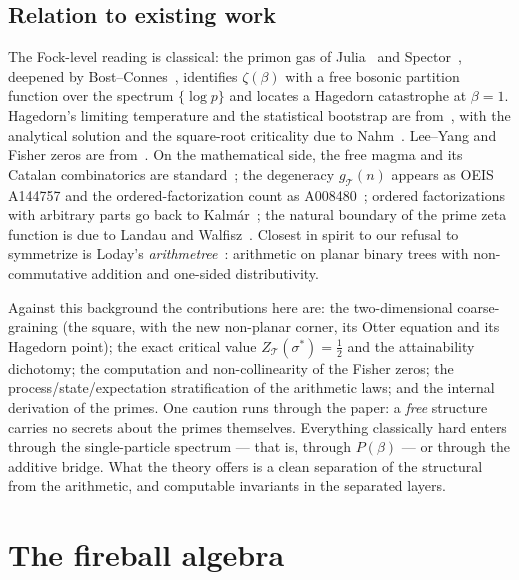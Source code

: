 \documentclass[11pt]{article}
\newcommand{\cT}{\mathcal{T}}   %
\numberwithin{equation}{section}
\theoremstyle{plain}
\theoremstyle{definition}
\theoremstyle{remark}
\begin{document}
\subsection{Relation to existing work}\label{sec:priorart}

The Fock-level reading is classical: the primon gas of Julia~\cite{julia} and
Spector~\cite{spector}, deepened by Bost--Connes~\cite{bostconnes}, identifies
$\zeta(\beta)$ with a free bosonic partition function over the spectrum
$\{\log p\}$ and locates a Hagedorn catastrophe at $\beta = 1$. Hagedorn's limiting
temperature and the statistical bootstrap are from~\cite{hagedorn,frautschi}, with the
analytical solution and the square-root criticality due to Nahm~\cite{nahm}.
Lee--Yang and Fisher zeros are from~\cite{leeyang,fisher}. On the mathematical side,
the free magma and its Catalan combinatorics are standard~\cite{stanley}; the
degeneracy $g_\cT(n)$ appears as OEIS A144757 and the ordered-factorization count as
A008480~\cite{oeis}; ordered factorizations with arbitrary parts go back to
Kalm\'ar~\cite{kalmar}; the natural boundary of the prime zeta function is due to
Landau and Walfisz~\cite{landauwalfisz}. Closest in spirit to our refusal to
symmetrize is Loday's \emph{arithmetree}~\cite{loday,brunoyasaki}: arithmetic on
planar binary trees with non-commutative addition and one-sided distributivity.

Against this background the contributions here are: the two-dimensional
coarse-graining (the square, with the new non-planar corner, its Otter equation and
its Hagedorn point); the exact critical value $Z_\cT(\sigma^{*}) = \tfrac12$ and the
attainability dichotomy; the computation and non-collinearity of the Fisher zeros;
the process/state/expectation stratification of the arithmetic laws; and the internal
derivation of the primes. One caution runs through the paper: a \emph{free} structure
carries no secrets about the primes themselves. Everything classically hard enters
through the single-particle spectrum --- that is, through $P(\beta)$ --- or through
the additive bridge. What the theory offers is a clean separation of the structural
from the arithmetic, and computable invariants in the separated layers.

\section{The fireball algebra}\label{sec:trees}
\end{document}
